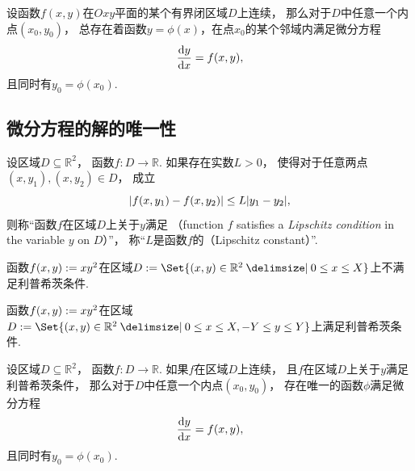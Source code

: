 \begin{theorem}
设函数\(f(x,y)\)在\(Oxy\)平面的某个有界闭区域\(D\)上连续，
那么对于\(D\)中任意一个内点\((x_0,y_0)\)，
总存在着函数\(y = \phi(x)\)，在点\(x_0\)的某个邻域内满足微分方程\begin{equation*}
	\dv{y}{x} = f(x,y),
\end{equation*}且同时有\(y_0 = \phi(x_0)\).
\end{theorem}

\subsection{微分方程的解的唯一性}
\begin{definition}
设区域\(D \subseteq \mathbb{R}^2\)，
函数\(f\colon D \to \mathbb{R}\).
如果存在实数\(L > 0\)，
使得对于任意两点\((x,y_1),(x,y_2) \in D\)，
成立\begin{equation*}
	\abs{ f(x,y_1) - f(x,y_2) }
	\leq
	L \abs{ y_1 - y_2 },
\end{equation*}
则称“函数\(f\)在区域\(D\)上关于\(y\)满足%
（function \(f\) satisfies a \emph{Lipschitz condition} in the variable \(y\) on \(D\)）”，
称“\(L\)是函数\(f\)的（Lipschitz constant）”.
\end{definition}

\begin{example}
函数\(f(x,y) := x y^2\)在区域\(D \defeq \Set{ (x,y) \in \mathbb{R}^2 \given 0 \leq x \leq X }\)上不满足利普希茨条件.
\end{example}
\begin{example}
函数\(f(x,y) := x y^2\)在区域\(D \defeq \Set{ (x,y) \in \mathbb{R}^2 \given 0 \leq x \leq X, -Y \leq y \leq Y }\)上满足利普希茨条件.
\end{example}

\begin{theorem}
设区域\(D \subseteq \mathbb{R}^2\)，
函数\(f\colon D \to \mathbb{R}\).
如果\(f\)在区域\(D\)上连续，
且\(f\)在区域\(D\)上关于\(y\)满足利普希茨条件，
那么对于\(D\)中任意一个内点\((x_0,y_0)\)，
存在唯一的函数\(\phi\)满足微分方程\begin{equation*}
	\dv{y}{x} = f(x,y),
\end{equation*}
且同时有\(y_0 = \phi(x_0)\).
\end{theorem}
